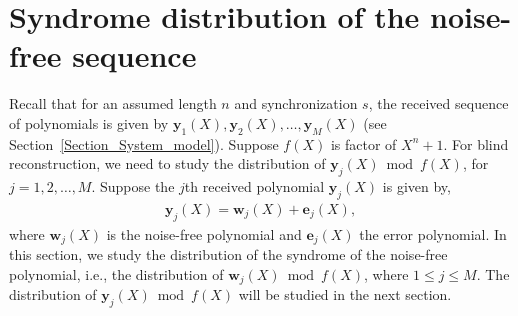 \documentclass[10pt,journal]{IEEEtran}
\begin{document}

\section{Syndrome distribution of the noise-free sequence}
\label{Section_cyclic_structure_noise_free}

Recall that for an assumed length $n$ and synchronization $s$, the received sequence of polynomials is given by
$\mathbf{y}_1(X),\mathbf{y}_2(X),\ldots,\mathbf{y}_M(X)$ (see Section~\ref{Section_System_model}).
Suppose $f(X)$ is factor of $X^n+1$.
For blind reconstruction, we need to study the distribution of $\mathbf{y}_j(X) \bmod f(X)$, for $j = 1,2,\ldots, M$.
% 
Suppose the $j$th received polynomial $\mathbf{y}_j(X)$ is given by,
% 
\begin{align}
%  
\mathbf{y}_j(X) = \mathbf{w}_j(X) + \mathbf{e}_j(X),
\label{Equation_yj_wj_ej_temp}
% 
\end{align}
% 
where $\mathbf{w}_j(X)$ is the noise-free polynomial and $\mathbf{e}_j(X)$ the error polynomial.
% 
In this section, we study the distribution of the syndrome of the noise-free polynomial, i.e., the distribution of $\mathbf{w}_j(X) \bmod f(X)$, 
where $1 \leq j \leq M$.
The distribution of $\mathbf{y}_j(X) \bmod f(X)$ will be studied in the next section.
% 
\end{document}
